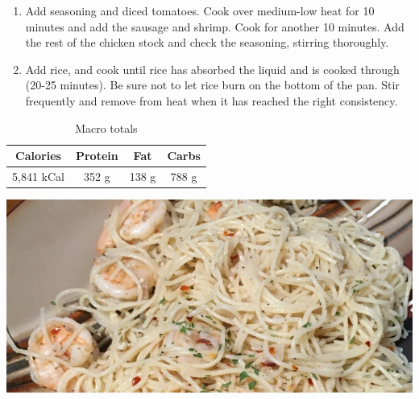 \documentclass{report}
\begin{document}
\begin{multicols}{2}
\begin{enumerate}
\item Add seasoning and diced tomatoes. Cook over medium-low heat for 10 minutes and add the sausage and shrimp. Cook for another 10 minutes. Add the rest of the chicken stock and check the seasoning, stirring thoroughly. 
\newline 

 \item Add rice, and cook until rice has absorbed the liquid and is cooked through (20-25 minutes). Be sure not to let rice burn on the bottom of the pan. Stir frequently and remove from heat when it has reached the right consistency. 
\end{enumerate}
\end{multicols}


\begin{table}[h!]
  \begin{center}
    \caption{Macro totals}
    \label{tab:table1}
    \begin{tabular}{c|c|c|c} %
      \textbf{Calories} & \textbf{Protein} & \textbf{Fat} & \textbf{Carbs}\\
      \hline
      5,841 kCal & 352 g & 138 g & 788 g\\
    \end{tabular}
  \end{center}
\end{table}
\begin{center}
\includegraphics[scale=0.65]{Pasta/Shrimp Scampi/Shrimp Scampi.jpg}
\end{center}
\end{document}
